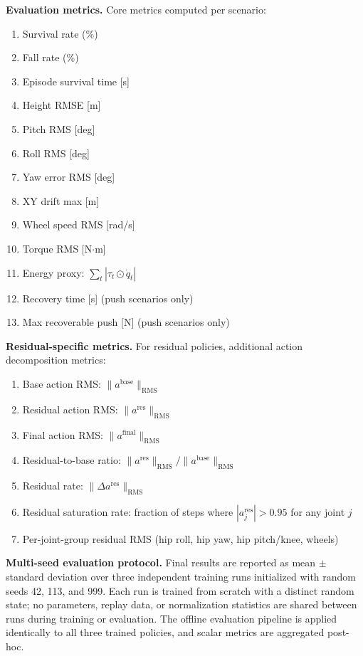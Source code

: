 \documentclass[conference]{IEEEtran}
\begin{document}
\noindent\textbf{Evaluation metrics.}
Core metrics computed per scenario:
\begin{enumerate}
    \item Survival rate (\%)
    \item Fall rate (\%)
    \item Episode survival time [s]
    \item Height RMSE [m]
    \item Pitch RMS [deg]
    \item Roll RMS [deg]
    \item Yaw error RMS [deg]
    \item XY drift max [m]
    \item Wheel speed RMS [rad/s]
    \item Torque RMS [N$\cdot$m]
    \item Energy proxy: $\sum_t |\tau_t \odot \dot{q}_t|$
    \item Recovery time [s] (push scenarios only)
    \item Max recoverable push [N] (push scenarios only)
\end{enumerate}

\noindent\textbf{Residual-specific metrics.}
For residual policies, additional action decomposition metrics:
\begin{enumerate}
    \item Base action RMS: $\|a^{\mathrm{base}}\|_{\mathrm{RMS}}$
    \item Residual action RMS: $\|a^{\mathrm{res}}\|_{\mathrm{RMS}}$
    \item Final action RMS: $\|a^{\mathrm{final}}\|_{\mathrm{RMS}}$
    \item Residual-to-base ratio: $\|a^{\mathrm{res}}\|_{\mathrm{RMS}} / \|a^{\mathrm{base}}\|_{\mathrm{RMS}}$
    \item Residual rate: $\|\Delta a^{\mathrm{res}}\|_{\mathrm{RMS}}$
    \item Residual saturation rate: fraction of steps where
    $|a_j^{\mathrm{res}}| > 0.95$ for any joint $j$
    \item Per-joint-group residual RMS (hip roll, hip yaw, hip pitch/knee, wheels)
\end{enumerate}

\noindent\textbf{Multi-seed evaluation protocol.}
Final results are reported as mean $\pm$ standard deviation over three
independent training runs initialized with random seeds 42, 113, and 999.
Each run is trained from scratch with a distinct random state;
no parameters, replay data, or normalization statistics are shared between
runs during training or evaluation.
The offline evaluation pipeline is applied identically to all three
trained policies, and scalar metrics are aggregated post-hoc.
\end{document}
